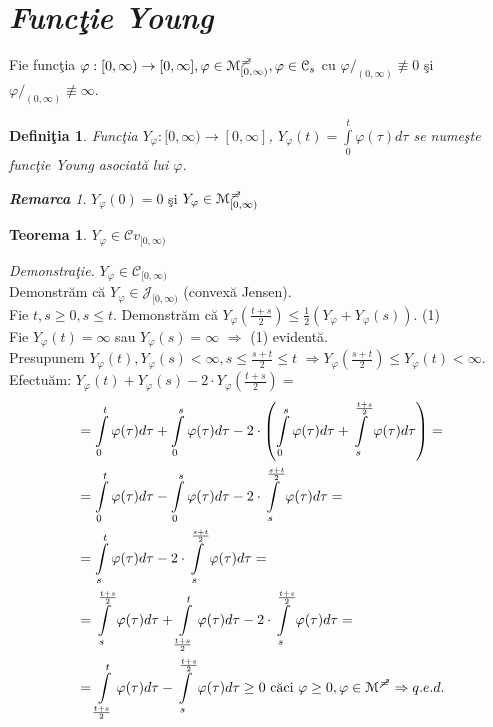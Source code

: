 \documentclass[ a4paper, 12pt]{report}
\newtheorem{theorem}{\bf Teorema}[section]
\newtheorem{definition}{\bf Defini\c tia}[section]
\theoremstyle{remark}
\newtheorem{remarc}{\bf Remarca}[section]
\numberwithin{equation}{section}
\begin{document}
\section{\textit{Func\c tie Young}}
Fie func\c tia $\varphi : [0,\infty) \rightarrow [0,\infty], \varphi \in \mathcal{M}_{[0,\infty)}^{\mc}, \varphi \in \mathcal{C}_s $ cu $\varphi/_{(0,\infty)} \not\equiv 0$ \c si $\varphi/_ {(0,\infty)}\not\equiv \infty$.
\begin{definition}
Func\c tia $Y_\varphi : [0,\infty) \rightarrow [0,\infty]$, $Y_\varphi(t) = \int\limits_{0}^{t}\varphi(\tau) d\tau$ se nume\c ste func\c tie Young asociat\u a lui $\varphi$.
\end{definition}
\begin{remarc}
$Y_\varphi (0) = 0$ \c si $Y_\varphi \in \mathcal{M}_{[0,\infty)}^{\mc}$
\end{remarc}
\begin{theorem}
$Y_\varphi \in \mathcal{C}v_{[0,\infty)}$
\end{theorem}
\textit{Demonstra\c tie.}
$Y_\varphi \in \mathcal{C}_{[0,\infty)}$
\\Demonstr\u am c\u a $Y_\varphi \in \mathcal{J}_{[0,\infty)}$ (convex\u a Jensen).\\
Fie $t,s\geq 0, s\leq t$. Demonstr\u am c\u a
$Y_\varphi(\frac{t+s}{2})\leq \frac{1}{2}(Y_\varphi + Y_\varphi (s)).$ \hspace{20mm} (1) \\
Fie $Y_\varphi (t) = \infty$ sau $Y_\varphi (s) = \infty$ $\Rightarrow$ (1) evident\u a.\\
Presupunem $Y_\varphi (t),Y_\varphi (s) < \infty,  s\leq\frac{s+t}{2}\leq t $
$\Rightarrow Y_\varphi (\frac{s+t}{2}) \leq Y_\varphi (t)<\infty.$
Efectu\u am:
$Y_\varphi (t) + Y_\varphi (s) - 2 \cdot Y_\varphi (\frac{t+s}{2})=$
\begin{align*}
&=\int\limits_{0}^{t} \varphi(\tau)d\tau + \int\limits_{0}^{s} \varphi(\tau)d\tau - 2 \cdot \left(\int\limits_{0}^{s} \varphi(\tau)d\tau + \int\limits_{s}^{\frac{t+s}{2}} \varphi(\tau)d\tau\right)=\\
&=\int\limits_{0}^{t} \varphi(\tau)d\tau - \int\limits_{0}^{s} \varphi(\tau)d\tau - 2 \cdot \int\limits_{s}^{\frac{s+t}{2}} \varphi(\tau)d\tau =\\
&=\int\limits_{s}^{t} \varphi(\tau)d\tau - 2 \cdot\int\limits_{s}^{\frac{s+t}{2}} \varphi(\tau)d\tau=\\
&=\int\limits_{s}^{\frac{t+s}{2}} \varphi(\tau)d\tau + \int\limits_{\frac{t+s}{2}}^{t} \varphi(\tau)d\tau - 2 \cdot \int\limits_{s}^{\frac{t+s}{2}}\varphi(\tau)d\tau=\\
&=\int\limits_{\frac{t+s}{2}}^{t} \varphi(\tau)d\tau - \int\limits_{s}^{\frac{t+s}{2}} \varphi(\tau)d\tau \geq 0 \ \mbox{c\u aci} \  \varphi \geq 0, \varphi \in \mathcal{M}^{\mc}\Rightarrow q.e.d.
\end{align*}
\end{document}
